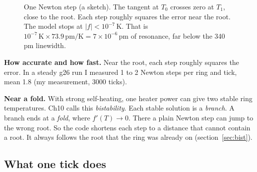 \documentclass[11pt,letterpaper]{article}
\begin{document}
\begin{figure}[H]
\centering
\begin{minipage}{0.42\linewidth}
\end{minipage}\hfill
\begin{minipage}{0.55\linewidth}
\caption{One Newton step (a sketch). The tangent at $T_0$ crosses zero at $T_1$, close to the root. Each step
roughly squares the error near the root. The model stops at $|f|<10^{-7}$\,K. That is
$10^{-7}\,\mathrm{K}\times73.9\,\mathrm{pm/K}=7\times10^{-6}$\,pm of resonance, far below the 340\,pm linewidth.}
\label{fig:newton}
\end{minipage}
\end{figure}

\textbf{How accurate and how fast.} Near the root, each step roughly squares the error. In a steady g26 run I
measured 1 to 2 Newton steps per ring and tick, mean 1.8 (my measurement, 3000 ticks).

\textbf{Near a fold.} With strong self-heating, one heater power can give two stable ring temperatures. Ch10 calls
this \emph{bistability}. Each stable solution is a \emph{branch}. A branch ends at a \emph{fold}, where $f'(T)\to0$.
There a plain Newton step can jump to the wrong root. So the code shortens each step to a distance that cannot
contain a root. It always follows the root that the ring was already on (section~\ref{sec:bist}).

\subsection{What one tick does}\label{sec:tick}
\end{document}

